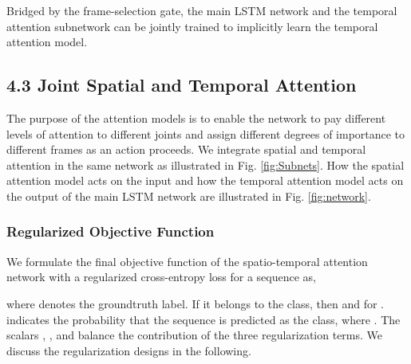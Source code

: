 \documentclass[letterpaper]{article}
\begin{document}
Bridged by the frame-selection gate, the main LSTM network and the temporal attention subnetwork can be jointly trained to implicitly learn the temporal attention model.
\begin{comment}

where  is a scalar whose value reflects the temporal attention weights, depending on the current input and hidden state from the last time step,  represents the parameters of PReLU \cite {he2015delving} jointly trained in the whole network.

For a video sequence, with the temporal attention assigned on each frame, we fuse all the hidden states across temporal domain \cite{CVPR15HRNN,zhu2015co} to summarize the relevant information and predict the final class label. Concretely, the hidden layer is then feed into a fully connected layer, whose outputs are accumulated with different temporal attention weights to get the probability that a sequence  belongs to the class :



where , and the labeling indicating different class types is denoted by ,  represents the length of the video sequence,  indicates the hidden state of the top layer of the LSTM network.
\end{comment}

\subsection{4.3 Joint Spatial and Temporal Attention}

The purpose of the attention models is to enable the network to pay different levels of attention to different joints and assign different degrees of importance to different frames as an action proceeds. We integrate spatial and temporal attention in the same network as illustrated in Fig. \ref{fig:Subnets}. How the spatial attention model acts on the input and how the temporal attention model acts on the output of the main LSTM network are illustrated in Fig. \ref{fig:network}.

\subsubsection{Regularized Objective Function}

We formulate the final objective function of the spatio-temporal attention network with a regularized cross-entropy loss for a sequence as,

where   denotes the groundtruth label. If it belongs to the  class, then  and  for .  indicates the probability that the sequence is predicted as the  class, where . The scalars , , and  balance the contribution of the three regularization terms. We discuss the regularization designs in the following.  
\end{document}
